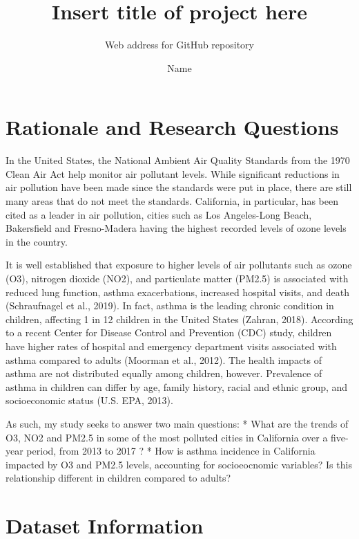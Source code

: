 \documentclass[12pt,]{article}
\title{Insert title of project here}
\subtitle{Web address for GitHub repository}
\author{Name}
\date{}
\begin{document}
\maketitle

\newpage
\tableofcontents 
\newpage
\listoftables 
\newpage
\listoffigures 
\newpage

\hypertarget{rationale-and-research-questions}{%
\section{Rationale and Research
Questions}\label{rationale-and-research-questions}}

In the United States, the National Ambient Air Quality Standards from
the 1970 Clean Air Act help monitor air pollutant levels. While
significant reductions in air pollution have been made since the
standards were put in place, there are still many areas that do not meet
the standards. California, in particular, has been cited as a leader in
air pollution, cities such as Los Angeles-Long Beach, Bakersfield and
Fresno-Madera having the highest recorded levels of ozone levels in the
country.

It is well established that exposure to higher levels of air pollutants
such as ozone (O3), nitrogen dioxide (NO2), and particulate matter
(PM2.5) is associated with reduced lung function, asthma exacerbations,
increased hospital visits, and death (Schraufnagel et al., 2019). In
fact, asthma is the leading chronic condition in children, affecting 1
in 12 children in the United States (Zahran, 2018). According to a
recent Center for Disease Control and Prevention (CDC) study, children
have higher rates of hospital and emergency department visits associated
with asthma compared to adults (Moorman et al., 2012). The health
impacts of asthma are not distributed equally among children, however.
Prevalence of asthma in children can differ by age, family history,
racial and ethnic group, and socioeconomic status (U.S. EPA, 2013).

As such, my study seeks to answer two main questions: * What are the
trends of O3, NO2 and PM2.5 in some of the most polluted cities in
California over a five-year period, from 2013 to 2017 ? * How is asthma
incidence in California impacted by O3 and PM2.5 levels, accounting for
socioeocnomic variables? Is this relationship different in children
compared to adults?

\newpage

\hypertarget{dataset-information}{%
\section{Dataset Information}\label{dataset-information}}
\end{document}
